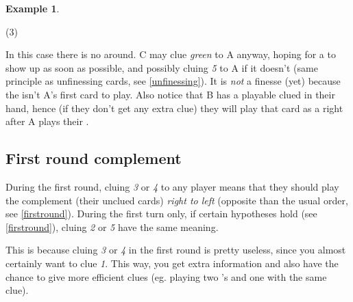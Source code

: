 \documentclass[a4paper]{article}
\theoremstyle{plain}
\theoremstyle{definition}
\newtheorem{example}[theorem]{Example}
\begin{document}
%	

\begin{example}
	\hfill
	\begin{tasks}(3)
		\task[+]      
		\task[A]    
		\task[B]    
		\task[C]    
		\task[D]    
		\task[E]    
	\end{tasks}
	
	In this case there is no  around. C may clue \textit{green} to A anyway, hoping for a  to show up as soon as possible, and possibly cluing \textit{5} to A if it doesn't (same principle as unfinessing cards, see \ref{unfinessing}). It is \textit{not} a finesse (yet) because the  isn't A's first card to play. Also notice that B has a playable clued  in their hand, hence (if they don't get any extra clue) they will play that card as a  right after A plays their .
\end{example}

\subsection{First round complement}
\label{firstroundcomplement}

During the first round, cluing \textit{3} or \textit{4} to any player means that they should play the complement (their unclued cards) \textit{right to left} (opposite than the usual order, see \ref{firstround}). During the first turn only, if certain hypotheses hold (see \ref{firstround}), cluing \textit{2} or \textit{5} have the same meaning.

This is because cluing \textit{3} or \textit{4} in the first round is pretty useless, since you almost certainly want to clue \textit{1}. This way, you get extra information and also have the chance to give more efficient clues (eg. playing two 's and one  with the same clue).
\end{document}
